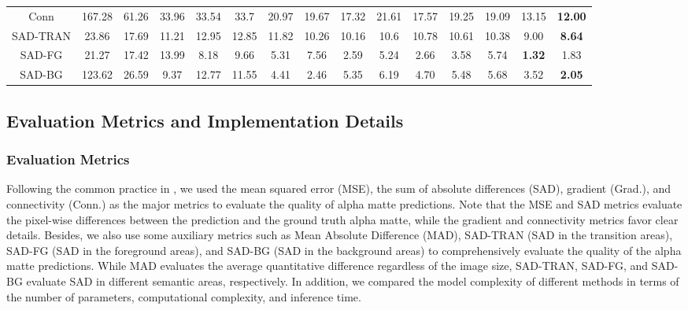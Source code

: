 \documentclass[twocolumn]{svjour3}
\begin{document}
\begin{table*}[htbp]
{\begin{tabular}{c|ccccc|ccc|ccc|ccc}
Conn & 167.28&61.26&33.96 &\multicolumn{1}{c|}{33.54}&\multicolumn{1}{c}{33.7} &\multicolumn{1}{c}{20.97}&19.67&\multicolumn{1}{c|}{17.32}&21.61&\multicolumn{1}{c}{17.57} &\multicolumn{1}{c}{19.25}&19.09 &13.15 & \textbf{12.00}\\
SAD-TRAN &23.86 &17.69&11.21&\multicolumn{1}{c|}{12.95} &\multicolumn{1}{c}{12.85} &\multicolumn{1}{c}{11.82}&10.26&\multicolumn{1}{c|}{10.16}&10.6&\multicolumn{1}{c}{10.78} &\multicolumn{1}{c}{10.61}&10.38 &9.00 & \textbf{8.64}\\
SAD-FG &21.27 &17.42&13.99&\multicolumn{1}{c|}{8.18}&\multicolumn{1}{c}{9.66} &\multicolumn{1}{c}{5.31}&7.56&\multicolumn{1}{c|}{2.59}&5.24&\multicolumn{1}{c}{2.66} &\multicolumn{1}{c}{3.58}&5.74 &\textbf{1.32} & 1.83\\
SAD-BG & 123.62&26.59&9.37&\multicolumn{1}{c|}{12.77} &\multicolumn{1}{c}{11.55} &\multicolumn{1}{c}{4.41}&2.46&\multicolumn{1}{c|}{5.35}&6.19&\multicolumn{1}{c}{4.70} &\multicolumn{1}{c}{5.48}& 5.68&3.52 &\textbf{2.05}\\
\hline
\end{tabular}}
\label{tab:tracks_results}
\end{table*}


\subsection{Evaluation Metrics and Implementation Details}

\subsubsection{Evaluation Metrics} Following the common practice in \citep{rhemann2009perceptually,zhang2019late,xu2017deep}, we used the mean squared error (MSE), the sum of absolute differences (SAD), gradient (Grad.), and connectivity (Conn.) as the major metrics to evaluate the quality of alpha matte predictions. Note that the MSE and SAD metrics evaluate the pixel-wise differences between the prediction and the ground truth alpha matte, while the gradient and connectivity metrics favor clear details. Besides, we also use some auxiliary metrics such as Mean Absolute Difference (MAD), SAD-TRAN (SAD in the transition areas), SAD-FG (SAD in the foreground areas), and SAD-BG (SAD in the background areas) to comprehensively evaluate the quality of the alpha matte predictions. While MAD evaluates the average quantitative difference regardless of the image size, SAD-TRAN, SAD-FG, and SAD-BG evaluate SAD in different semantic areas, respectively. In addition, we compared the model complexity of different methods in terms of the number of parameters, computational complexity, and inference time.
\end{document}
